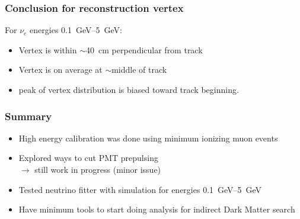 \documentclass{beamer}
\begin{document}
\begin{frame}
	\frametitle{Conclusion for reconstruction vertex}
	For $\nu_{e}$ energies \SIrange[range-phrase=--]{0.1}{5}{\giga\electronvolt}:
	\begin{itemize}
		\item Vertex is within $\sim$\SI{40}{\centi\meter} perpendicular from
			track
		\item Vertex is on average at $\sim$middle of track
		\item peak of vertex distribution is biased toward track beginning.
	\end{itemize}
\end{frame}

\begin{frame}
	\frametitle{Summary}
	\begin{itemize}
		\item High energy calibration was done using minimum ionizing muon
			events	
		\item Explored ways to cut PMT prepulsing \\
			$\rightarrow$ still work in progress (minor issue)
		\item Tested neutrino fitter with simulation for energies
			\SIrange[range-phrase=--]{0.1}{5}{\giga\electronvolt}
		\item Have minimum tools to start doing analysis for indirect Dark
			Matter search
	\end{itemize}
\end{frame}
\end{document}
